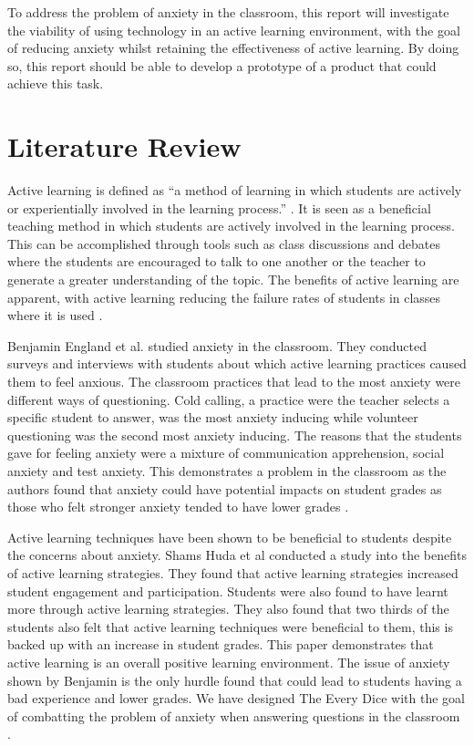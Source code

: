 \documentclass{sigchi}
\begin{document}
To address the problem of anxiety in the classroom, this report will investigate the viability of using technology in an active learning environment, with the goal of reducing anxiety whilst retaining the effectiveness of active learning. By doing so, this report should be able to develop a prototype of a product that could achieve this task. 

\section{Literature Review}

Active learning is defined as “a method of learning in which students are actively or experientially involved in the learning process.” \cite{bonwell_eison_1991}. It is seen as a beneficial teaching method in which students are actively involved in the learning process. This can be accomplished through tools such as class discussions and debates where the students are encouraged to talk to one another or the teacher to generate a greater understanding of the topic. The benefits of active learning are apparent, with active learning reducing the failure rates of students in classes where it is used \cite{freeman_eddy_mcdonough_smith_okoroafor_jordt_wenderoth_2014}.  

Benjamin England et al. studied anxiety in the classroom. They conducted surveys and interviews with students about which active learning practices caused them to feel anxious. The classroom practices that lead to the most anxiety were different ways of questioning. Cold calling, a practice were the teacher selects a specific student to answer, was the most anxiety inducing while volunteer questioning was the second most anxiety inducing. The reasons that the students gave for feeling anxiety were a mixture of communication apprehension, social anxiety and test anxiety. This demonstrates a problem in the classroom as the authors found that anxiety could have potential impacts on student grades as those who felt stronger anxiety tended to have lower grades \cite{england_brigati_schussler_2017}.

Active learning techniques have been shown to be beneficial to students despite the concerns about anxiety. Shams Huda et al conducted a study into the benefits of active learning strategies. They found that active learning strategies increased student engagement and participation. Students were also found to have learnt more through active learning strategies. They also found that two thirds of the students also felt that active learning techniques were beneficial to them, this is backed up with an increase in student grades. This paper demonstrates that active learning is an overall positive learning environment. The issue of anxiety shown by Benjamin is the only hurdle found that could lead to students having a bad experience and lower grades. We have designed The Every Dice with the goal of combatting the problem of anxiety when answering questions in the classroom \cite{ul_huda_ali_nanji_cassum_2016}.
\end{document}

